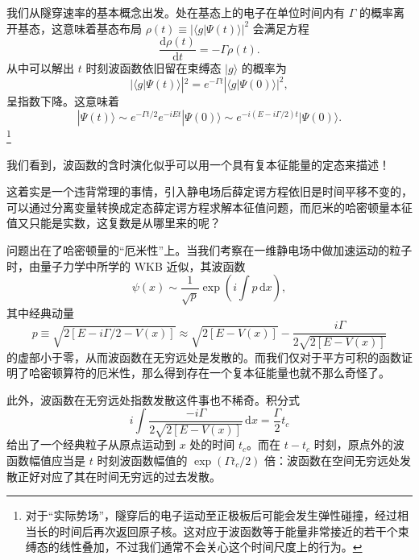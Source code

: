 我们从隧穿速率的基本概念出发。处在基态上的电子在单位时间内有 $\Gamma$ 的概率离开基态，这意味着基态布局 $\rho(t)\equiv|\langle g|\Psi(t)\rangle|^2$ 会满足方程
\begin{equation}
 \frac{\mathrm d\rho(t)}{\mathrm dt}=-\Gamma\rho(t).
\tag{6.1.29}
\end{equation}
从中可以解出 $t$ 时刻波函数依旧留在束缚态 $|g\rangle$ 的概率为
\begin{equation}
 |\langle g|\Psi(t)\rangle|^2=e^{-\Gamma t}|\langle g|\Psi(0)\rangle|^2,
\tag{6.1.30}
\end{equation}
呈指数下降。这意味着
\begin{equation}
 |\Psi(t)\rangle\sim e^{-\Gamma t/2}e^{-iEt}|\Psi(0)\rangle\sim e^{-i(E-i\Gamma/2)t}|\Psi(0)\rangle.
\tag{6.1.31}
\end{equation}
\footnote{对于“实际势场”，隧穿后的电子运动至正极板后可能会发生弹性碰撞，经过相当长的时间后再次返回原子核。这对应于波函数等于能量非常接近的若干个束缚态的线性叠加，不过我们通常不会关心这个时间尺度上的行为。}

我们看到，波函数的含时演化似乎可以用一个具有复本征能量的定态来描述！

这着实是一个违背常理的事情，引入静电场后薛定谔方程依旧是时间平移不变的，可以通过分离变量转换成定态薛定谔方程求解本征值问题，而厄米的哈密顿量本征值又只能是实数，这复数是从哪里来的呢？

问题出在了哈密顿量的“厄米性”上。当我们考察在一维静电场中做加速运动的粒子时，由量子力学中所学的 WKB 近似，其波函数
\begin{equation}
 \psi(x)\sim\frac1{\sqrt p}\exp\left(i\int p\,\mathrm dx\right),
\tag{6.1.32}
\end{equation}
其中经典动量
\begin{equation}
 p\equiv\sqrt{2[E-i\Gamma/2-V(x)]}
 \approx\sqrt{2[E-V(x)]}-\frac{i\Gamma}{2\sqrt{2[E-V(x)]}}
\tag{6.1.33}
\end{equation}
的虚部小于零，从而波函数在无穷远处是发散的。而我们仅对于平方可积的函数证明了哈密顿算符的厄米性，那么得到存在一个复本征能量也就不那么奇怪了。

此外，波函数在无穷远处指数发散这件事也不稀奇。积分式
\begin{equation}
 i\int\frac{-i\Gamma}{2\sqrt{2[E-V(x)]}}\,\mathrm dx=\frac\Gamma2t_c
\tag{6.1.34}
\end{equation}
给出了一个经典粒子从原点运动到 $x$ 处的时间 $t_c$。而在 $t-t_c$ 时刻，原点外的波函数幅值应当是 $t$ 时刻波函数幅值的 $\exp(\Gamma t_c/2)$ 倍：波函数在空间无穷远处发散正好对应了其在时间无穷远的过去发散。

